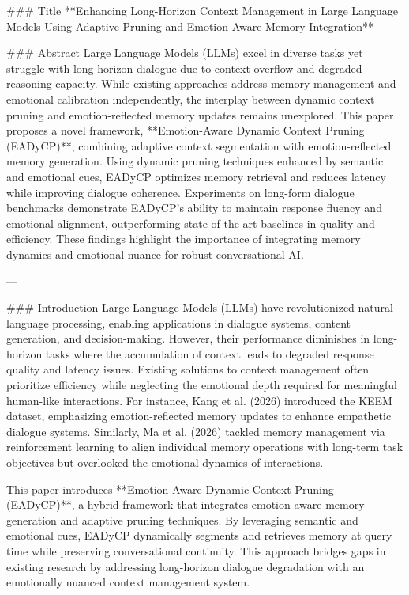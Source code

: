 ### Title
**Enhancing Long-Horizon Context Management in Large Language Models Using Adaptive Pruning and Emotion-Aware Memory Integration**

### Abstract
Large Language Models (LLMs) excel in diverse tasks yet struggle with long-horizon dialogue due to context overflow and degraded reasoning capacity. While existing approaches address memory management and emotional calibration independently, the interplay between dynamic context pruning and emotion-reflected memory updates remains unexplored. This paper proposes a novel framework, **Emotion-Aware Dynamic Context Pruning (EADyCP)**, combining adaptive context segmentation with emotion-reflected memory generation. Using dynamic pruning techniques enhanced by semantic and emotional cues, EADyCP optimizes memory retrieval and reduces latency while improving dialogue coherence. Experiments on long-form dialogue benchmarks demonstrate EADyCP's ability to maintain response fluency and emotional alignment, outperforming state-of-the-art baselines in quality and efficiency. These findings highlight the importance of integrating memory dynamics and emotional nuance for robust conversational AI.

---

### Introduction
Large Language Models (LLMs) have revolutionized natural language processing, enabling applications in dialogue systems, content generation, and decision-making. However, their performance diminishes in long-horizon tasks where the accumulation of context leads to degraded response quality and latency issues. Existing solutions to context management often prioritize efficiency while neglecting the emotional depth required for meaningful human-like interactions. For instance, Kang et al. (2026) introduced the KEEM dataset, emphasizing emotion-reflected memory updates to enhance empathetic dialogue systems. Similarly, Ma et al. (2026) tackled memory management via reinforcement learning to align individual memory operations with long-term task objectives but overlooked the emotional dynamics of interactions.

This paper introduces **Emotion-Aware Dynamic Context Pruning (EADyCP)**, a hybrid framework that integrates emotion-aware memory generation and adaptive pruning techniques. By leveraging semantic and emotional cues, EADyCP dynamically segments and retrieves memory at query time while preserving conversational continuity. This approach bridges gaps in existing research by addressing long-horizon dialogue degradation with an emotionally nuanced context management system.

